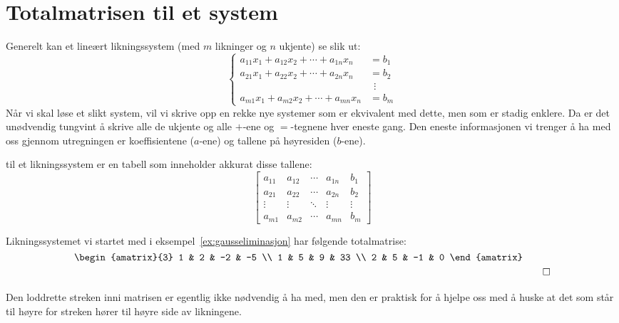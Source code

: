 \section*{Totalmatrisen til et system}

Generelt kan et lineært likningssystem (med $m$ likninger og $n$
ukjente) se slik ut:
\[
\left\{
\begin{aligned}
  a_{11} x_1 + a_{12} x_2 + \cdots + a_{1n} x_n &= b_1 \\
  a_{21} x_1 + a_{22} x_2 + \cdots + a_{2n} x_n &= b_2 \\
                                                &\ \ \vdots \\
  a_{m1} x_1 + a_{m2} x_2 + \cdots + a_{mn} x_n &= b_m
\end{aligned}
\right.
\]
Når vi skal løse et slikt system, vil vi skrive opp en rekke nye
systemer som er ekvivalent med dette, men som er stadig enklere.  Da
er det unødvendig tungvint å skrive alle de ukjente og alle $+$-ene og
$=$-tegnene hver eneste gang.  Den eneste informasjonen vi trenger å
ha med oss gjennom utregningen er koeffisientene ($a$-ene) og tallene
på høyresiden ($b$-ene).

 til et likningssystem er en tabell som
inneholder akkurat disse tallene:
\[
\left[
\begin{array}{cccc|c}
  a_{11} & a_{12} & \cdots & a_{1n} & b_1 \\
  a_{21} & a_{22} & \cdots & a_{2n} & b_2 \\
  \vdots & \vdots & \ddots & \vdots & \vdots \\
  a_{m1} & a_{m2} & \cdots & a_{mn} & b_m
\end{array}
\right]
\]

\begin{ex}
Likningssystemet vi startet med i eksempel~\ref{ex:gausseliminasjon}
har følgende totalmatrise:
\[
\raisebox{15pt}{$
\begin{amatrix}{3}
1 & 2 & -2 & -5 \\
1 & 5 &  9 & 33 \\
2 & 5 & -1 & 0
\end{amatrix}
$}\qedhere
\]
\end{ex}

Den loddrette streken inni matrisen er egentlig ikke nødvendig å ha
med, men den er praktisk for å hjelpe oss med å huske at det som står
til høyre for streken hører til høyre side av likningene.

\kapittelslutt
